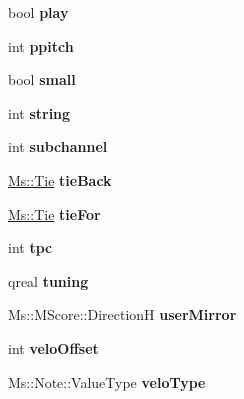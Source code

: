 \begin{DoxyCompactItemize}
\item 
\mbox{\label{class_ms_1_1_note_a083679b845232d1fbbcbeb281bafb8c5}} 
bool {\bfseries play}
\item 
\mbox{\label{class_ms_1_1_note_aa1789bcbae5527812ffeea825578a654}} 
int {\bfseries ppitch}
\item 
\mbox{\label{class_ms_1_1_note_a8d5740405767e411d20fa1c5d328751e}} 
bool {\bfseries small}
\item 
\mbox{\label{class_ms_1_1_note_aaac2257b4b983dea1ac221a94be17ca5}} 
int {\bfseries string}
\item 
\mbox{\label{class_ms_1_1_note_aee3fd9f4eed361ec021af28b415c76b7}} 
int {\bfseries subchannel}
\item 
\mbox{\label{class_ms_1_1_note_ade22b1e82bd5cd2965dfd8da55c5fe97}} 
\hyperlink{class_ms_1_1_tie}{Ms\+::\+Tie} {\bfseries tie\+Back}
\item 
\mbox{\label{class_ms_1_1_note_ad380ab7173137e92f176372a725dccdb}} 
\hyperlink{class_ms_1_1_tie}{Ms\+::\+Tie} {\bfseries tie\+For}
\item 
\mbox{\label{class_ms_1_1_note_ab891b5173066be8775ca607c55a59088}} 
int {\bfseries tpc}
\item 
\mbox{\label{class_ms_1_1_note_afd31d0cd964afd95d1d9b50149dc3486}} 
qreal {\bfseries tuning}
\item 
\mbox{\label{class_ms_1_1_note_a2a7e8aefea828c5b4c80d548b4f79fef}} 
Ms\+::\+M\+Score\+::\+DirectionH {\bfseries user\+Mirror}
\item 
\mbox{\label{class_ms_1_1_note_a5386a4bb5aa863a598b2d046b0ab0821}} 
int {\bfseries velo\+Offset}
\item 
\mbox{\label{class_ms_1_1_note_a8340d0280f590a279cead2b9ea3e67d2}} 
Ms\+::\+Note\+::\+Value\+Type {\bfseries velo\+Type}
\end{DoxyCompactItemize}
